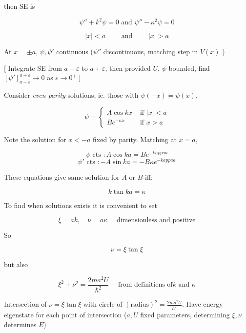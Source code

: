 \documentclass[a4paper]{article}
\begin{document}
then SE is 

\[ \psi''  + k^{2} \psi = 0 \text{ and } \psi'' - \kappa^{2} \psi = 0 \]

\[ | x | < a \qquad \text{ and } \qquad | x | > a \]

At $ x = \pm a $, $ \psi,\psi' $ continuous ($ \psi'' $ discontinuous, matching step in $ V(x) $ )

[ Integrate SE from $ a - \varepsilon $ to $ a + \varepsilon $, then provided $ U $, $ \psi $ bounded, find $ [\psi']_{a - \varepsilon}^{a + \varepsilon} \to 0 $ as $ \varepsilon \to 0^{+} $ ]

Consider \emph{even parity} solutions, ie. those with $ \psi(-x) = \psi(x) $,

\[ \psi = \begin{cases} A \cos k x  & \text{ if } | x | < a \\ Be^{-\kappa x} & \text{ if } x > a \end{cases} \]

Note the solution for $ x < -a $ fixed by parity. Matching at $ x = a $,

\[ \psi \text{ cts }: A \cos k a = B e^{-kappa a} \]
\[ \psi' \text{ cts }: - A \sin k a = - B \kappa e^{-kappa a} \]

These equations give same solution for $ A $ or $ B $ iff:

\[ k \tan k a = \kappa \]

To find when solutions exists it is convenient to set

\[ \xi = a k, \quad \nu = a \kappa \quad \text{ dimensionless and positive} \]

So 

\[ \nu = \xi \tan \xi \]

but also 

\[ \xi^{2} + \nu^{2} = \frac{2ma^{2}U}{\hbar^{2}} \quad \text{ from definitiens of} k \text{ and } \kappa \]

Intersection of $ \nu = \xi \tan \xi $ with circle of $ (\text{radius})^{2} = \frac{2ma^{2} U}{\hbar^{2}} $. Have energy eigenstate for each point of intersection ($ a,U $ fixed parameters, determining $ \xi,\nu $ determines $ E $)
\end{document}
